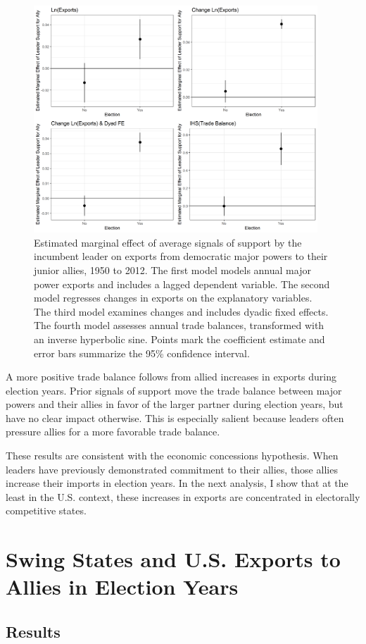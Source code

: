 \documentclass[12pt]{article}
\begin{document}
\begin{figure}[htpb]
	\centering
		\includegraphics[width=0.95\textwidth]{../figures/me-plots-mp.png}
	\caption{Estimated marginal effect of average signals of support by the incumbent leader on exports from democratic major powers to their junior allies, 1950 to 2012. The first model models annual major power exports and includes a lagged dependent variable. The second model regresses changes in exports on the explanatory variables. The third model examines changes and includes dyadic fixed effects. The fourth model assesses annual trade balances, transformed with an inverse hyperbolic sine. Points mark the coefficient estimate and error bars summarize the 95\% confidence interval.}
	\label{fig:me-plots-mp}
\end{figure}


A more positive trade balance follows from allied increases in exports during election years.
Prior signals of support move the trade balance between major powers and their allies in favor of the larger partner during election years, but have no clear impact otherwise.
This is especially salient because leaders often pressure allies for a more favorable trade balance.


These results are consistent with the economic concessions hypothesis. 
When leaders have previously demonstrated commitment to their allies, those allies increase their imports in election years.
In the next analysis, I show that at the least in the U.S. context, these increases in exports are concentrated in electorally competitive states.




\section{Swing States and U.S. Exports to Allies in Election Years}


\subsection{Results}



\singlespace
 
 
\end{document}
